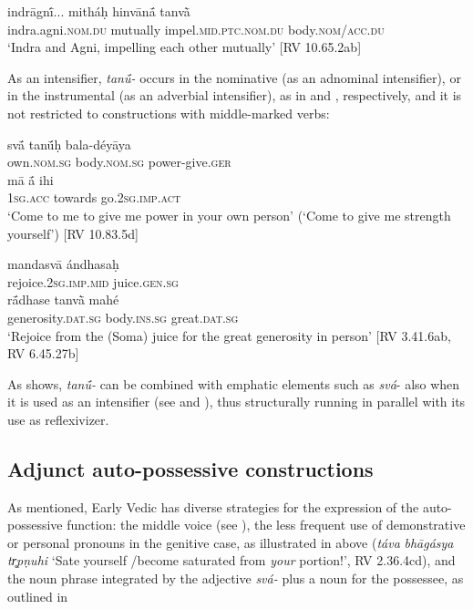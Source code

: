 \documentclass[output=paper]{langscibook}
\begin{document}
 \ea
\label{ex:Orqueda:21}
\gll indrāgn\'{ī}...  mitháḥ  hinvān\'{ā}  tanv\`{ā}\\
   indra.agni.\textsc{nom.du}  mutually  impel.\textsc{mid.ptc.nom.du}  body.\textsc{nom/acc.du}\\
\glt ‘Indra and Agni, impelling each other mutually’ [RV 10.65.2ab]
\z

As an intensifier, \textit{tan\'{ū}-} occurs in the nominative (as an adnominal intensifier), or in the instrumental (as an adverbial intensifier), as in  and , respectively, and it is not restricted to constructions with middle-marked verbs:

\ea %
\label{ex:Orqueda:22}
\ea
\label{ex:Orqueda:22a}
\gll sv\'{ā}  tan\'{ū}ḥ  bala-déyāya\\
     own.\textsc{nom.sg}  body.\textsc{nom.sg}  power-give.\textsc{ger}\\

\gll    mā  \'{ā}   ihi\\
   1\textsc{sg.acc}  towards  go.\textsc{2sg.imp.act}\\
\glt     ‘Come to me to give me power in your own person’ (‘Come to give me strength yourself’) [RV 10.83.5d]

\ex
\label{ex:Orqueda:22b}
\gll mandasvā   ándhasaḥ\\
     rejoice.\textsc{2sg.imp.mid}    juice.\textsc{gen.sg}\\

\gll r\'{ā}dhase  tanv\`{ā}  mahé\\
     generosity.\textsc{dat.sg}  body.\textsc{ins.sg}  great.\textsc{dat.sg}\\
\glt  ‘Rejoice from the (Soma) juice for the great generosity in person’
[RV 3.41.6ab, RV 6.45.27b]
\z
\z

As  shows, \textit{tan\'{ū}-} can be combined with emphatic elements such as \textit{svá}{}- also when it is used as an intensifier (see \citealt{Kulikov2007Reflexive} and \citealt{Orqueda2019}), thus structurally running in parallel with its use as reflexivizer.



\subsection{Adjunct auto-possessive constructions}
\label{sec:Orqueda:2.3}



As mentioned, Early Vedic has diverse strategies for the expression of the auto-possessive function: the middle voice (see ), the less frequent use of demonstrative or personal pronouns in the genitive case, as illustrated in  above ({\textit{táva} }\textit{bhāgásya tr̥pṇuhi} ‘Sate yourself /become saturated from \textit{your} portion!’, RV 2.36.4cd), and the noun phrase integrated by the adjective \textit{svá-} plus a noun for the possessee, as outlined in 
\end{document}
